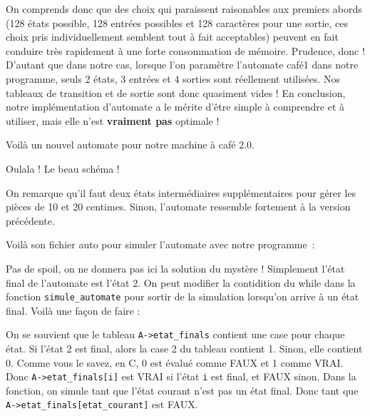 \documentclass[10pt]{article}
\begin{document}
\begin{enumerate}[label=\textbf{[\alph*]}]
  On comprends donc que des choix qui paraissent raisonables aux
  premiers abords (128 états possible, 128 entrées possibles et 128
  caractères pour une sortie, ces choix pris individuellement semblent
  tout à fait acceptables) peuvent en fait conduire très rapidement à
  une forte consommation de mémoire. Prudence, donc ! D'autant que
  dans notre cas, lorsque l'on paramètre l'automate café1 dans notre
  programme, seuls 2 états, 3 entrées et 4 sorties sont réellement
  utilisées. Nos tableaux de transition et de sortie sont donc
  quasiment vides ! En conclusion, notre implémentation d'automate a
  le mérite d'être simple à comprendre et à utiliser, mais elle n'est
  \textbf{vraiment pas} optimale !

\item Voilà un nouvel automate pour notre machine à café 2.0.

  \begin{center}
    Oulala ! Le beau schéma !
  \end{center}

  On remarque qu'il faut deux états intermédiaires supplémentaires
  pour gérer les pièces de 10 et 20 centimes. Sinon, l'automate
  ressemble fortement à la version précédente.
  \vspace{0.2cm}

  Voilà son fichier auto pour simuler l'automate avec notre
  programme~:

  \lstset{style=none}
  
  \vspace{0.2cm}

\item Pas de spoil, on ne donnera pas ici la solution du mystère !
  Simplement l'état final de l'automate est l'état 2. On peut modifier
  la contidition du while dans la fonction \texttt{simule\_automate}
  pour sortir de la simulation lorsqu'on arrive à un état final. Voilà
  une façon de faire :

  \lstset{style=customc}
  
  \vspace{0.2cm}

  On se souvient que le tableau \texttt{A->etat\_finals} contient une
  case pour chaque état. Si l'état 2 est final, alors la case 2 du
  tableau contient 1. Sinon, elle contient 0. Comme vous le savez, en
  C, 0 est évalué comme FAUX et 1 comme VRAI. Donc
  \texttt{A->etat\_finals[i]} est VRAI si l'état \texttt{i} est final,
  et FAUX sinon. Dans la fonction, on simule tant que l'état courant
  n'est pas un état final. Donc tant que
  \texttt{A->etat\_finals[etat\_courant]} est FAUX.

\end{enumerate}
\end{document}
